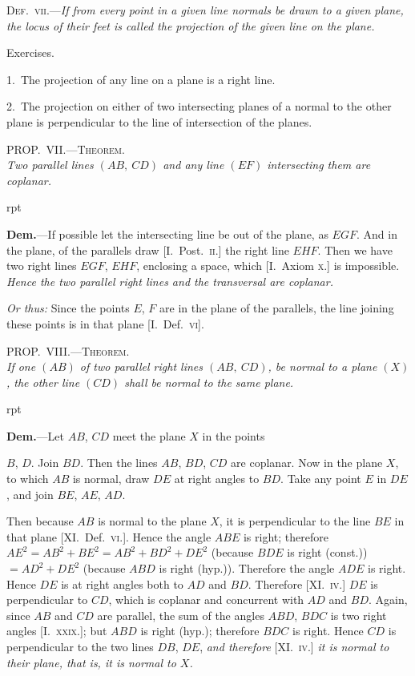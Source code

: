 \documentclass[oneside]{book}
\newcounter{wrapwidth}
\newcommand\myprop[2]{
\bigskip\Needspace*{4\baselineskip}\begin{center}\textsc{#1}\\\medskip\emph{#2}\par\end{center}
}
\newcommand\exhead[1]{
\Needspace*{5\baselineskip}\begin{center}
\textsf{#1}
\end{center}
}
\newcommand\imgflow[3]{
\setcounter{wrapwidth}{#1}

\begin{wrapfigure}[#2]{r}{\value{wrapwidth}pt}
\begin{center}
\vspace{-0.3in}

\end{center}
\end{wrapfigure}
}
\begin{document}
\smallskip
\textsc{Def.~vii.}---\textit{If from every point in a given line normals
be drawn to a given plane, the locus of their feet is called
the projection of the given line on the plane.}

\exhead{Exercises.}

\begin{footnotesize}
1.~The projection of any line on a plane is a right line.

2.~The projection on either of two intersecting planes of a
normal to the other plane is perpendicular to the line of intersection
of the planes.
\par\end{footnotesize}

\myprop{PROP\@.~VII\@.---Theorem.}{Two parallel lines $(AB,\ CD)$ and any line $(EF)$ intersecting
them are coplanar.}


\imgflow{150}{6}{f221}

\textbf{Dem.}---If possible let the intersecting line be out of
the plane, as $EGF$. And in
the plane, of the parallels
draw [I.~Post.~\textsc{ii}.] the
right line $EHF$.  Then
we have two right lines
$EGF$, $EHF$, enclosing a
space, which [I.~Axiom \textsc{x.}] is impossible. \textit{Hence the
two parallel right lines and the transversal are coplanar.}

\smallskip
\begin{footnotesize}
\emph{Or thus:} Since the points $E$, $F$ are in the plane of the parallels,
the line joining these points is in that plane [I.~Def.~\textsc{vi}].
\par\end{footnotesize}

\myprop{PROP\@.~VIII\@.---Theorem.}{If one $(AB)$ of two parallel right lines $(AB,\ CD)$, be
normal to a plane $(X)$, the other line $(CD)$ shall be normal
to the same plane.}


\imgflow{100}{11}{f222}

\textbf{Dem.}---Let $AB$, $CD$ meet the plane $X$ in the points

$B$, $D$. Join $BD$. Then the lines $AB$, $BD$, $CD$ are coplanar.
Now in the plane $X$, to
which $AB$ is normal, draw $DE$ at
right angles to $BD$. Take any
point $E$ in $DE$, and join $BE$, $AE$,
$AD$.

Then because $AB$ is normal to
the plane $X$, it is perpendicular to
the line $BE$ in that plane [XI\@.\ Def.~\textsc{vi.}].
Hence the angle $ABE$
is right; therefore $AE^{2} = AB^{2} + BE^{2}
= AB^{2} + BD^{2} + DE^{2}$ (because $BDE$
is right (const.)) $= AD^{2} + DE^{2}$ (because $ABD$ is right
(hyp.)). Therefore the angle $ADE$ is right. Hence
$DE$ is at right angles both to $AD$ and $BD$. Therefore
[XI\@.~\textsc{iv.}] $DE$ is perpendicular to $CD$, which is coplanar
and concurrent with $AD$ and $BD$. Again, since $AB$
and $CD$ are parallel, the sum of the angles $ABD$, $BDC$
is two right angles [I.~\textsc{xxix.}]; but $ABD$ is right (hyp.);
therefore $BDC$ is right. Hence $CD$ is perpendicular to
the two lines $DB$, $DE$, \textit{and therefore} [XI\@.~\textsc{iv.}] \textit{it is normal
to their plane, that is, it is normal to $X$.}
\end{document}
